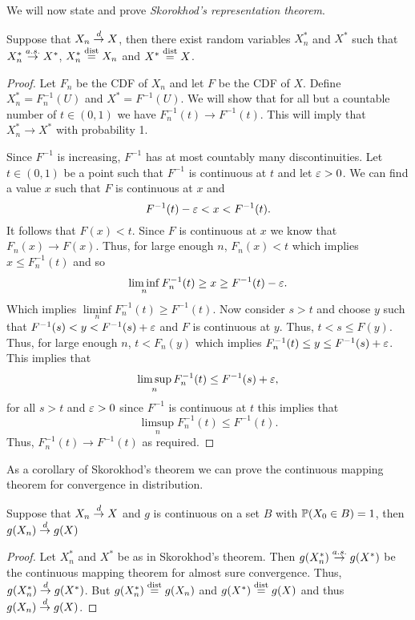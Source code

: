 We will now state and prove \emph{Skorokhod's representation theorem}.
\begin{theorem}
    Suppose that $X_n \stackrel{d}{\to} X$, then there exist random variables $X_n^*$ and $X^*$ such that $X_n^* \stackrel{a.s.}{\to} X^*$, $X_n^* \stackrel{\mathrm{dist}}{=} X_n$ and $X^* \stackrel{\mathrm{dist}}{=} X$. 
\end{theorem}
\begin{proof}[Proof]
    Let $F_n$ be the CDF of $X_n$ and let $F$ be the CDF of $X$. Define $X_n^* = F_n^{-1}(U)$ and $X^* = F^{-1}(U)$. We will show that for all but a countable number of $t \in (0,1)$ we have $F_n^{-1}(t) \to F^{-1}(t)$. This will imply that $X_n^* \to X^*$ with probability 1.

    Since $F^{-1}$ is increasing, $F^{-1}$ has at most countably many discontinuities. Let $t \in (0,1)$ be a point such that $F^{-1}$ is continuous at $t$ and let $\varepsilon > 0$. We can find a value $x$ such that $F$ is continuous at $x$ and 
    \[F^{-1}(t)-\varepsilon < x<F^{-1}(t). \]
    It follows that $F(x) < t$. Since $F$ is continuous at $x$ we know that $F_n(x) \to F(x)$. Thus, for large enough $n$, $F_n(x) < t$ which implies $x \le F_n^{-1}(t)$ and so 
    \[\liminf\limits_n F_n^{-1}(t) \ge x \ge F^{-1}(t)-\varepsilon.\] 
    Which implies $\liminf\limits_n F_n^{-1}(t) \ge F^{-1}(t)$. Now consider $s > t$ and choose $y$ such that $F^{-1}(s) < y < F^{-1}(s)+\varepsilon$ and $F$ is continuous at $y$. Thus, $t < s \le F(y)$. Thus, for large enough $n$, $t < F_n(y)$ which implies $F_n^{-1}(t) \le y \le F^{-1}(s)+\varepsilon$. This implies that 
    \[\limsup_{n}F_n^{-1}(t) \le F^{-1}(s)+\varepsilon, \]
    for all $s>t$ and $\varepsilon > 0$ since $F^{-1}$ is continuous at $t$ this implies that 
    \[\limsup_{n}F_n^{-1}(t) \le F^{-1}(t). \]
    Thus, $F_n^{-1}(t) \to F^{-1}(t)$ as required. 
\end{proof}
As a corollary of Skorokhod's theorem we can prove the continuous mapping theorem for convergence in distribution.
\begin{corollary}
    Suppose that $X_n \stackrel{d}{\to} X$ and $g$ is continuous on a set $B$ with ${\mathbb{P}}(X_0 \in B) =1$, then $g(X_n) \stackrel{d}{\to} g(X)$
\end{corollary}
\begin{proof}
    Let $X_n^*$ and $X^*$ be as in Skorokhod's theorem. Then $g(X_n^*) \stackrel{a.s.}{\to} g(X^*)$ be the continuous mapping theorem for almost sure convergence. Thus, $g(X_n^*) \stackrel{d}{\to} g(X^*)$. But $g(X_n^*) \stackrel{\mathrm{dist}}{=} g(X_n)$ and $g(X^*) \stackrel{\mathrm{dist}}{=} g(X)$ and thus $g(X_n) \stackrel{d}{\to} g(X)$.
\end{proof}
